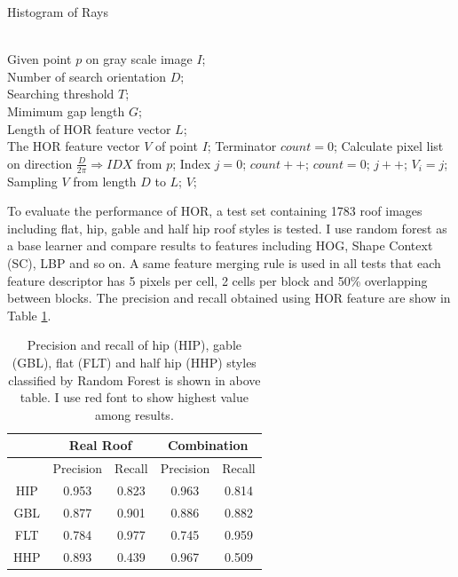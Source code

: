 \documentclass{iitthesis}
\begin{document}
{\linespread{1.5}
\begin{algorithm}[htb]   
	\caption{ Histogram of Rays}   
	\label{alg: 2}   
	\begin{algorithmic}[1] 
		\REQUIRE ~~\\
		Given point $p$ on gray scale image $I$;\\
		Number of search orientation $D$;\\
		Searching threshold $T$;\\
		Mimimum gap length $G$;\\
		Length of HOR feature vector $L$;
		\ENSURE ~~\\  
		The HOR feature vector $V$ of point $I$; 
			\STATE Terminator $count = 0$;
			\STATE Calculate pixel list on direction $\frac{D}{2\pi} \Rightarrow IDX$ from $p$;
			\STATE Index $j=0$;
					\STATE $count ++$;
				\ELSE
					\STATE $count = 0$;
				\ENDIF
				\STATE $j ++$;
			\ENDWHILE
			\STATE $V_i = j$;
		\ENDFOR 
		\STATE Sampling $V$ from length $D$ to $L$;
		\RETURN $V$; 
	\end{algorithmic}  
\end{algorithm} 
}

To evaluate the performance of HOR, a test set containing 1783 roof images including flat, hip, gable and half hip roof styles is tested. I use random forest as a base learner and compare results to features including HOG, Shape Context (SC), LBP and so on. A same feature merging rule is used in all tests that each feature descriptor has 5 pixels per cell, 2 cells per block and 50\% overlapping between blocks. The precision and recall obtained using HOR feature are show in Table \ref{table: pr}.

\begin{table}[t]
\caption{Precision and recall of hip (HIP), gable (GBL), flat (FLT) and half hip (HHP) styles classified by Random Forest is shown in above table. I use red font to show highest value among results.}
	\centering
	\scalebox{1.0}
	{
		\begin{tabular}{ccccc}
			\hline \hline
			&\multicolumn{2}{c}{{Real Roof}} & \multicolumn{2}{c}{{Combination}}\\ 
			\hline
			
			&\multicolumn{1}{c}{{Precision}} & \multicolumn{1}{c}{{Recall}} & \multicolumn{1}{c}{{Precision}} & \multicolumn{1}{c}{{Recall}}\\

			
			HIP & 0.953 & 0.823 & 0.963 & 0.814 \\

			
			GBL & 0.877 & 0.901 & 0.886 & 0.882 \\

			
			FLT & 0.784 & 0.977 & 0.745 & 0.959 \\

			
			HHP & 0.893 & 0.439 & 0.967 & 0.509 \\ 			 
			\hline
			
		\end{tabular}
	}
	\label{table: pr}
\end{table}
\end{document}
